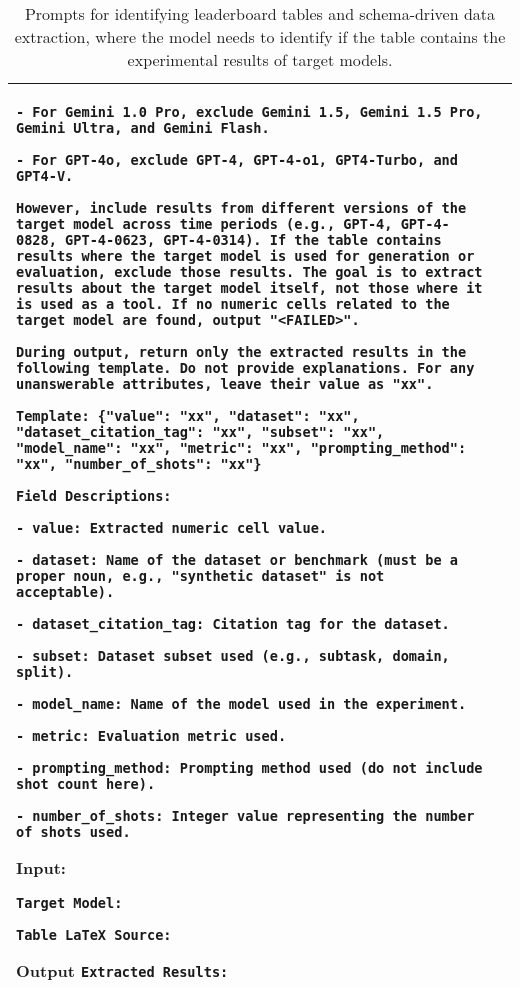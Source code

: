 \begin{table*}[ht]
\begin{tabular}{p{}|p{}}
\texttt{- For Gemini 1.0 Pro, exclude Gemini 1.5, Gemini 1.5 Pro, Gemini Ultra, and Gemini Flash.}

\texttt{- For GPT-4o, exclude GPT-4, GPT-4-o1, GPT4-Turbo, and GPT4-V.} \newline

\texttt{However, include results from different versions of the target model across time periods (e.g., GPT-4, GPT-4-0828, GPT-4-0623, GPT-4-0314). If the table contains results where the target model is used for generation or evaluation, exclude those results. The goal is to extract results about the target model itself, not those where it is used as a tool. If no numeric cells related to the target model are found, output "<FAILED>".}

\texttt{During output, return only the extracted results in the following template. Do not provide explanations. For any unanswerable attributes, leave their value as "xx".}

\texttt{Template:
\{"value": "xx", "dataset": "xx", "dataset\_citation\_tag": "xx", "subset": "xx", "model\_name": "xx", "metric": "xx", "prompting\_method": "xx", "number\_of\_shots": "xx"\}}

\texttt{Field Descriptions:}

\texttt{- value: Extracted numeric cell value.}

\texttt{- dataset: Name of the dataset or benchmark (must be a proper noun, e.g., "synthetic dataset" is not acceptable).}

\texttt{- dataset\_citation\_tag: Citation tag for the dataset.}

\texttt{- subset: Dataset subset used (e.g., subtask, domain, split).}

\texttt{- model\_name: Name of the model used in the experiment.}

\texttt{- metric: Evaluation metric used.}

\texttt{- prompting\_method: Prompting method used (do not include shot count here).}

\texttt{- number\_of\_shots: Integer value representing the number of shots used.}

\textbf{Input:}

\texttt{Target Model: }

\texttt{Table LaTeX Source: }

\textbf{Output}
\texttt{Extracted Results:} \\ 

    \bottomrule
    \end{tabular}
    \caption{Prompts for identifying leaderboard tables and schema-driven data extraction, where the model needs to identify if the table contains the experimental results of target models.}
    \label{tab:prompt_example}  
\end{table*}  


